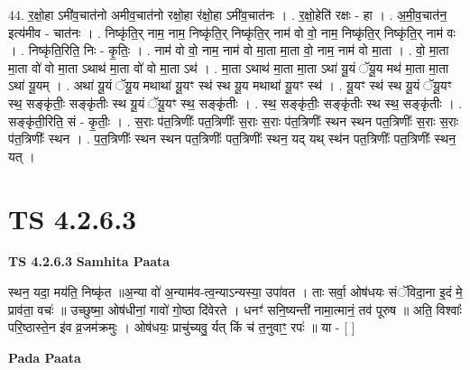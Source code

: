 \documentclass[17pt]{extarticle}
\begin{document}
44. र॒क्षो॒हा ऽमी॑व॒चात॑नो अमीव॒चात॑नो रक्षो॒हा र॑क्षो॒हा ऽमी॑व॒चात॑नः । . र॒क्षो॒हेति॑ रक्षः - हा । . अ॒मी॒व॒चात॑न॒ इत्य॑मीव - चात॑नः । . निष्कृ॑ति॒र् नाम॒ नाम॒ निष्कृ॑ति॒र् निष्कृ॑ति॒र् नाम॑ वो वो॒ नाम॒ निष्कृ॑ति॒र् निष्कृ॑ति॒र् नाम॑ वः । . निष्कृ॑ति॒रिति॒ निः - कृ॒तिः॒ । . नाम॑ वो वो॒ नाम॒ नाम॑ वो मा॒ता मा॒ता वो॒ नाम॒ नाम॑ वो मा॒ता । . वो॒ मा॒ता मा॒ता वो॑ वो मा॒ता ऽथाथ॑ मा॒ता वो॑ वो मा॒ता ऽथ॑ । . मा॒ता ऽथाथ॑ मा॒ता मा॒ता ऽथा॑ यू॒यं ॅयू॒य मथ॑ मा॒ता मा॒ता ऽथा॑ यू॒यम् । . अथा॑ यू॒यं ॅयू॒य मथाथा॑ यू॒यꣳ स्थ॑ स्थ यू॒य मथाथा॑ यू॒यꣳ स्थ॑ । . यू॒यꣳ स्थ॑ स्थ यू॒यं ॅयू॒यꣳ स्थ॒ सङ्कृ॑तीः॒ सङ्कृ॑तीः स्थ यू॒यं ॅयू॒यꣳ स्थ॒ सङ्कृ॑तीः । . स्थ॒ सङ्कृ॑तीः॒ सङ्कृ॑तीः स्थ स्थ॒ सङ्कृ॑तीः । . सङ्कृ॑ती॒रिति॒ सं - कृ॒तीः॒ । . स॒राः प॑त॒त्रिणीः᳚ पत॒त्रिणीः᳚ स॒राः स॒राः प॑त॒त्रिणीः᳚ स्थन स्थन पत॒त्रिणीः᳚ स॒राः स॒राः प॑त॒त्रिणीः᳚ स्थन । . प॒त॒त्रिणीः᳚ स्थन स्थन पत॒त्रिणीः᳚ पत॒त्रिणीः᳚ स्थन॒ यद् यथ् स्थ॑न पत॒त्रिणीः᳚ पत॒त्रिणीः᳚ स्थन॒ यत् । \newline
\pagebreak
{}

\section{ TS 4.2.6.3 }

\textbf{TS 4.2.6.3 } \newline
\textbf{Samhita Paata} \newline

स्थन॒ यदा॒ मय॑ति॒ निष्कृ॑त ॥अ॒न्या वो॑ अ॒न्याम॑व-त्व॒न्याऽन्यस्या॒ उपा॑वत । ताः सर्वा॒ ओष॑धयः संॅविदा॒ना इ॒दं मे॒ प्राव॑ता॒ वचः॑ ॥ उच्छुष्मा॒ ओष॑धीनां॒ गावो॑ गो॒ष्ठा दि॑वेरते । धनꣳ॑ सनि॒ष्यन्ती॑ नामा॒त्मानं॒ तव॑ पूरुष ॥ अति॒ विश्वाः᳚ परि॒ष्ठास्ते॒न इ॑व व्र॒जम॑क्रमुः । ओष॑धयः॒ प्राचु॑च्यवु॒ र्यत् किं च॑ त॒नुवाꣳ॒॒ रपः॑ ॥ या - [  ] \newline

\textbf{Pada Paata} \newline
\end{document}
